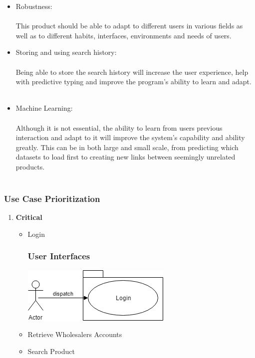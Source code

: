 \documentclass[a4paper,10pt]{article}
\begin{document}
{\begin{itemize}
		\item Robustness:\\\\
			This product should be able to adapt to different users in various fields as well as to different habits, interfaces, environments and needs of users.  
	
		\item Storing and using search history:\\\\
			Being able to store the search history will increase the user experience, help with predictive typing and improve the program's ability to learn and adapt.\\\\
	
		\item Machine Learning:\\\\
			Although it is not essential, the ability to learn from users previous interaction and adapt to it will improve the system’s capability and ability greatly. This can be in both large and small scale, from predicting which datasets to load first to creating new links between seemingly unrelated products.\\\\
		\end{itemize}

	
	\subsubsection{Use Case Prioritization} 
		\begin{enumerate} 
		\item \textbf{Critical} 
			\begin{itemize} 
				\item Login
                 \subsubsection{User Interfaces}
		 \includegraphics[scale=0.62]{login.png}

				\item Retrieve Wholesalers Accounts 
				\item Search Product 
				

\end{itemize}
\end{enumerate}}
\end{document}
